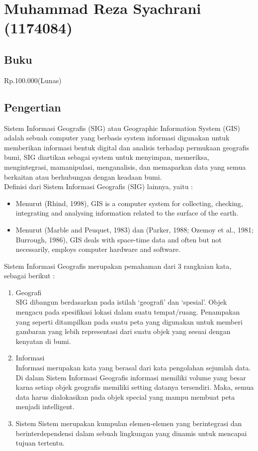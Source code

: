 
\section{Muhammad Reza Syachrani (1174084)}
\subsection{Buku}
Rp.100.000(Lunas)
\subsection{Pengertian}
    \hspace{1cm} Sistem Informasi Geografis (SIG) atau Geographic Information System (GIS) adalah sebuah computer yang berbasis system informasi digunakan untuk memberikan informasi bentuk digital dan analisis terhadap permukaan geografis bumi, SIG diartikan sebagai system untuk menyimpan, memeriksa, mengintegrasi, mamanipulasi, menganalisis, dan memaparkan data yang semua berkaitan atau berhubungan dengan keadaan bumi.\\
    Definisi dari Sistem Informasi Geografis (SIG) lainnya, yaitu :
    \begin{itemize}
        \item Menurut (Rhind, 1998), GIS is a computer system for collecting, checking, integrating and analysing information related to the surface of the earth.
        \item Menurut (Marble and Peuquet, 1983) dan (Parker, 1988; Ozemoy et al., 1981; Burrough, 1986), GIS deals with space-time data and often but not necessarily, employs computer hardware and software.
    \end{itemize}
    \par Sistem Informasi Geografis merupakan pemahaman dari 3 rangkaian kata, sebagai berikut :
    \begin{enumerate}
        \item Geografi\\
        SIG dibangun berdasarkan pada istilah ‘geografi’ dan ‘spesial’. Objek mengacu pada spesifikasi lokasi dalam suatu tempat/ruang. Penampakan yang seperti ditampilkan pada suatu peta yang digunakan untuk memberi gambaran yang lebih representasi dari suatu objek yang sesuai dengan kenyatan di bumi.
        \item Informasi\\
        Informasi merupakan kata yang berasal dari kata pengolahan sejumlah data. Di dalam Sistem Informasi Geografis informasi memiliki volume yang besar karna setiap objek geografis memiliki setting datanya tersendiri. Maka, semua data harus dialokasikan pada objek special yang mampu membuat peta menjadi intelligent.
        \item Sistem
        Sistem merupakan kumpulan elemen-elemen yang berintegrasi dan berinterdependensi dalam sebuah lingkungan yang dinamis untuk mencapai tujuan tertentu.
    \end{enumerate}
